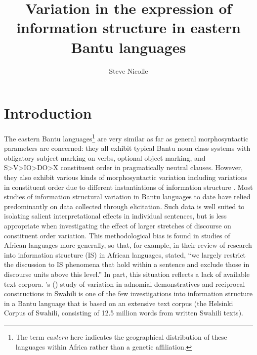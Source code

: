 \documentclass[output=paper]{langsci/langscibook}
\title{Variation in the expression of information structure in eastern {Bantu} languages}
\author{%
Steve Nicolle\affiliation{Canada Institute of Linguistics / SIL International} 
}
\begin{document}
 


\section{Introduction}\label{§1:introduction.nicolle}

The eastern Bantu languages\footnote{The term \textit{eastern} here indicates the geographical distribution of these languages within Africa rather than a genetic affiliation.} are very similar as far as general morphosyntactic parameters are concerned: they all exhibit typical Bantu noun class systems with obligatory subject marking on verbs, optional object marking, and S>V>IO>DO>X constituent order in pragmatically neutral clauses. However, they also exhibit various kinds of morphosyntactic variation \citep{martenetal2007,vanderwalbiberauer2014} including variations in constituent order due to different instantiations of information structure \citep{zerbian2006,buelletal2011,yoneda2011,downinghymanforth}. Most studies of information structural variation in Bantu languages to date have relied predominantly on data collected through elicitation. Such data is well suited to isolating salient interpretational effects in individual sentences, but is less appropriate when investigating the effect of larger stretches of discourse on constituent order variation. This methodological bias is found in studies of African languages more generally, so that, for example, \citet[157]{gueldemannetal2015} in their review of research into information structure (IS) in African languages, stated, “we largely restrict the discussion to IS phenomena that hold within a sentence and exclude those in discourse units above this level.” In part, this situation reflects a lack of available text corpora. \citeauthor{mwamzandi2014}’s (\citeyear{mwamzandi2014}) study of variation in adnomial demonstratives and reciprocal constructions in Swahili is one of the few investigations into information structure in a Bantu language that is based on an extensive text corpus (the Helsinki Corpus of Swahili, consisting of 12.5 million words from written Swahili texts).
\end{document}
